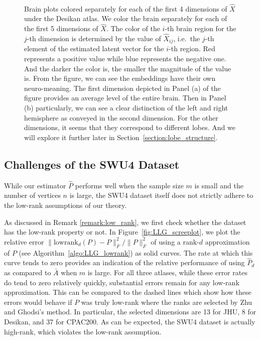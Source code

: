 \begin{figure}
\begin{subfigure}[t]{.7\textwidth}
\begin{center}
\end{center}
\end{subfigure}\\
\caption[Brain plots colored separately for each of the first 4 dimensions of embedding under the Desikan atlas]{Brain plots colored separately for each of the first 4 dimensions of $\hat{X}$ under the Desikan atlas.
We color the brain separately for each of the first 5 dimensions of $\hat{X}$.
The color of the $i$-th brain region for the $j$-th dimension is determined by the value of $\hat{X}_{ij}$, i.e.\ the $j$-th element of the estimated latent vector for the $i$-th region. Red represents a positive value while blue represents the negative one. And the darker the color is, the smaller the magnitude of the value is.
From the figure, we can see the embeddings have their own neuro-meaning.
The first dimension depicted in Panel (a) of the figure provides an average level of the entire brain. Then in Panel (b) particularly, we can see a clear distinction of the left and right hemisphere as conveyed in the second dimension. For the other dimensions, it seems that they correspond to different lobes. And we will explore it further later in Section~\ref{section:lobe_structure}.}
\label{fig:eigenvector_brain}
\end{figure}



\subsection{Challenges of the SWU4 Dataset}

While our estimator $\hat{P}$ performs well when the sample size $m$ is small and the number of vertices $n$ is large, the SWU4 dataset itself does not strictly adhere to the low-rank assumptions of our theory.

As discussed in Remark \ref{remark:low_rank}, we first check whether the dataset has the low-rank property or not. In Figure~\ref{fig:LLG_screeplot}, we plot the relative error $\|\mathrm{lowrank}_d(P)-P\|_F^2/\|P\|_F^2$ of using a rank-$d$ approximation of $P$ (see Algorithm~\ref{algo:LLG_lowrank}) as solid curves.
The rate at which this curve tends to zero provides an indication of the relative performance of using $\hat{P}_d$ as compared to $\bar{A}$ when $m$ is large. 
For all three atlases, while these error rates do tend to zero relatively quickly, substantial errors remain for any low-rank approximation.
This can be compared to the dashed lines which show how these errors would behave if $P$ was truly low-rank where the ranks are selected by Zhu and Ghodsi's method.
In particular, the selected dimensions are 13 for JHU, 8 for Desikan, and 37 for CPAC200.
As can be expected, the SWU4 dataset is actually high-rank, which violates the low-rank assumption.

